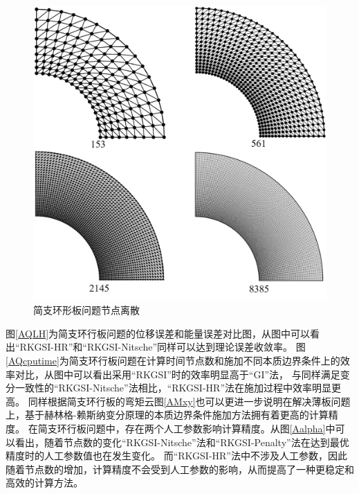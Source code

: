 \begin{figure}[H]
    \centering
    \includegraphics[scale=0.45]{figure/PHR/A/annularmsh.png}
    \caption{简支环形板问题节点离散}\label{annularmsh}
\end{figure}
图\ref{AQLH}为简支环行板问题的位移误差和能量误差对比图，从图中可以看出“RKGSI-HR”和“RKGSI-Nitsche”同样可以达到理论误差收敛率。
图\ref{AQcputime}为简支环行板问题在计算时间节点数和施加不同本质边界条件上的效率对比，从图中可以看出采用“RKGSI”时的效率明显高于“GI”法，
与同样满足变分一致性的“RKGSI-Nitsche”法相比，“RKGSI-HR”法在施加过程中效率明显更高。
同样根据简支环行板的弯矩云图\ref{AMxy}也可以更进一步说明在解决薄板问题上，基于赫林格-赖斯纳变分原理的本质边界条件施加方法拥有着更高的计算精度。
在简支环行板问题中，存在两个人工参数影响计算精度。从图\ref{Aalpha}中可以看出，随着节点数的变化“RKGSI-Nitsche”法和“RKGSI-Penalty”法在达到最优精度时的人工参数值也在发生变化。
而“RKGSI-HR”法中不涉及人工参数，因此随着节点数的增加，计算精度不会受到人工参数的影响，从而提高了一种更稳定和高效的计算方法。
